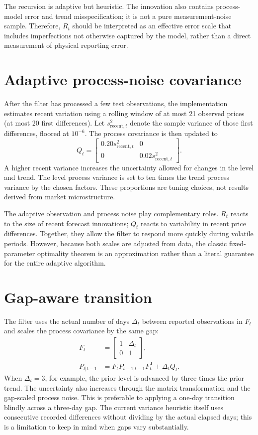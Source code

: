 \documentclass[12pt,a4paper,oneside]{report}
\numberwithin{equation}{chapter}
\numberwithin{figure}{chapter}
\numberwithin{table}{chapter}
\theoremstyle{definition}
\theoremstyle{plain}
\newcommand{\1}{\mathbf{1}}
\newcommand{\trans}{^{\mathsf T}}
\begin{document}
The recursion is adaptive but heuristic. The innovation also contains process-model error and trend misspecification; it is not a pure measurement-noise sample. Therefore, $R_t$ should be interpreted as an effective error scale that includes imperfections not otherwise captured by the model, rather than a direct measurement of physical reporting error.

\section{Adaptive process-noise covariance}
After the filter has processed a few test observations, the implementation estimates recent variation using a rolling window of at most 21 observed prices (at most 20 first differences). Let $s_{\mathrm{recent},t}^2$ denote the sample variance of those first differences, floored at $10^{-6}$. The process covariance is then updated to
\begin{equation}
  Q_t=\begin{bmatrix}
  0.20s_{\mathrm{recent},t}^2&0\\
  0&0.02s_{\mathrm{recent},t}^2
  \end{bmatrix}.
  \label{eq:adaptiveQ}
\end{equation}
A higher recent variance increases the uncertainty allowed for changes in the level and trend. The level process variance is set to ten times the trend process variance by the chosen factors. These proportions are tuning choices, not results derived from market microstructure.

The adaptive observation and process noise play complementary roles. $R_t$ reacts to the size of recent forecast innovations; $Q_t$ reacts to variability in recent price differences. Together, they allow the filter to respond more quickly during volatile periods. However, because both scales are adjusted from data, the classic fixed-parameter optimality theorem is an approximation rather than a literal guarantee for the entire adaptive algorithm.

\section{Gap-aware transition}
The filter uses the actual number of days $\Delta_t$ between reported observations in $F_t$ and scales the process covariance by the same gap:
\begin{align}
  F_t&=\begin{bmatrix}1&\Delta_t\\0&1\end{bmatrix},\\
  P_{t|t-1}&=F_tP_{t-1|t-1}F_t\trans+\Delta_tQ_t.
\end{align}
When $\Delta_t=3$, for example, the prior level is advanced by three times the prior trend. The uncertainty also increases through the matrix transformation and the gap-scaled process noise. This is preferable to applying a one-day transition blindly across a three-day gap. The current variance heuristic itself uses consecutive recorded differences without dividing by the actual elapsed days; this is a limitation to keep in mind when gaps vary substantially.
\end{document}
